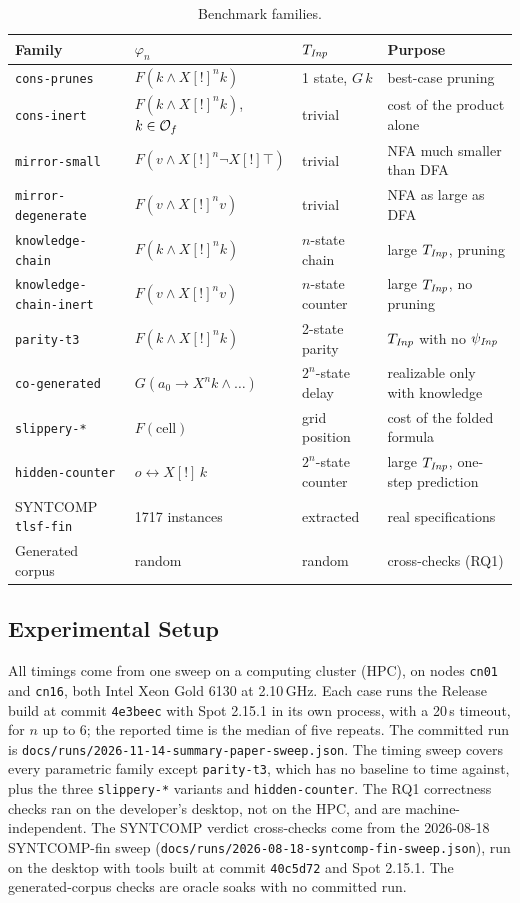\begin{table}[H]
\centering
\small
\caption{Benchmark families.}\label{tab:families}
\begin{tabular}{lllp{3.5cm}}
\toprule
Family & $\varphi_n$ & $T_{\mathit{Inp}}$ & Purpose \\
\midrule
\texttt{cons-prunes} & $F(k \wedge X[!]^n k)$ & 1 state, $G\,k$ & best-case pruning \\
\texttt{cons-inert} & $F(k \wedge X[!]^n k)$, $k \in \mathcal{O}_{f}$ & trivial & cost of the product alone \\
\texttt{mirror-small} & $F(v \wedge X[!]^n \neg X[!]\top)$ & trivial & NFA much smaller than DFA \\
\texttt{mirror-degenerate} & $F(v \wedge X[!]^n v)$ & trivial & NFA as large as DFA \\
\texttt{knowledge-chain} & $F(k \wedge X[!]^n k)$ & $n$-state chain & large $T_{\mathit{Inp}}$, pruning \\
\texttt{knowledge-chain-inert} & $F(v \wedge X[!]^n v)$ & $n$-state counter & large $T_{\mathit{Inp}}$, no pruning \\
\texttt{parity-t3} & $F(k \wedge X[!]^n k)$ & 2-state parity & $T_{\mathit{Inp}}$ with no $\psi_{\mathit{Inp}}$ \\
\texttt{co-generated} & $G(a_0 \rightarrow X^n k \wedge \ldots)$ & $2^n$-state delay & realizable only with knowledge \\
\midrule
\texttt{slippery-*} & $F(\text{cell})$ & grid position & cost of the folded formula \\
\texttt{hidden-counter} & $o \leftrightarrow X[!]\,k$ & $2^n$-state counter & large $T_{\mathit{Inp}}$, one-step prediction \\
\midrule
SYNTCOMP \texttt{tlsf-fin} & 1717 instances & extracted & real specifications \\
Generated corpus & random & random & cross-checks (RQ1) \\
\bottomrule
\end{tabular}
\end{table}

\subsection{Experimental Setup}

All timings come from one sweep on a computing cluster (HPC), on nodes \texttt{cn01} and \texttt{cn16}, both Intel Xeon Gold 6130 at 2.10\,GHz.
Each case runs the Release build at commit \texttt{4e3beec} with Spot 2.15.1 in its own process, with a 20\,s timeout, for $n$ up to 6; the reported time is the median of five repeats.
The committed run is \texttt{docs/runs/2026-11-14-summary-paper-sweep.json}.
The timing sweep covers every parametric family except \texttt{parity-t3}, which has no  baseline to time against, plus the three \texttt{slippery-*} variants and \texttt{hidden-counter}.
The RQ1 correctness checks ran on the developer's desktop, not on the HPC, and are machine-independent.
The SYNTCOMP verdict cross-checks come from the 2026-08-18 SYNTCOMP-fin sweep (\texttt{docs/runs/2026-08-18-syntcomp-fin-sweep.json}), run on the desktop with tools built at commit \texttt{40c5d72} and Spot 2.15.1.
The generated-corpus checks are oracle soaks with no committed run.
